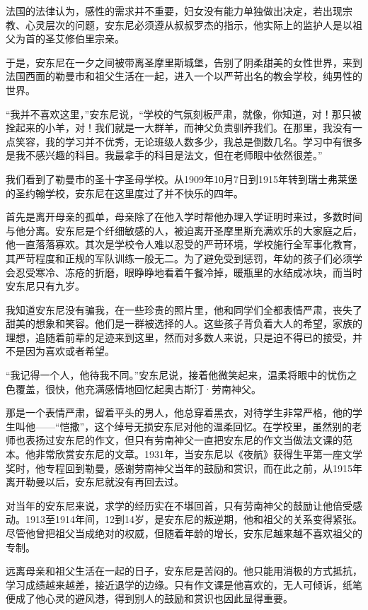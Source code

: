 法国的法律认为，感性的需求并不重要，妇女没有能力单独做出决定，若出现宗教、心灵层次的问题，安东尼必须遵从叔叔罗杰的指示，他实际上的监护人是以祖父为首的圣艾修伯里宗亲。

于是，安东尼在一夕之间被带离圣摩里斯城堡，告别了阴柔甜美的女性世界，来到法国西面的勒曼市和祖父生活在一起，进入一个以严苛出名的教会学校，纯男性的世界。

“我并不喜欢这里，”安东尼说，“学校的气氛刻板严肃，就像，你知道，对！那只被拴起来的小羊，对！我们就是一大群羊，而神父负责驯养我们。在那里，我没有一点笑容，我的学习并不优秀，无论班级人数多少，我总是倒数几名。学习中有很多是我不感兴趣的科目。我最拿手的科目是法文，但在老师眼中依然很差。”

我们看到了勒曼市的圣十字圣母学校。从1909年10月7日到1915年转到瑞士弗莱堡的圣约翰学校，安东尼在这里度过了并不快乐的四年。

首先是离开母亲的孤单，母亲除了在他入学时帮他办理入学证明时来过，多数时间与他分离。安东尼是个纤细敏感的人，被迫离开圣摩里斯充满欢乐的大家庭之后，他一直落落寡欢。其次是学校令人难以忍受的严苛环境，学校施行全军事化教育，其严苛程度和正规的军队训练一般无二。为了避免受到惩罚，年幼的孩子们必须学会忍受寒冷、冻疮的折磨，眼睁睁地看着午餐冷掉，暖瓶里的水结成冰块，而当时安东尼只有九岁。

我知道安东尼没有骗我，在一些珍贵的照片里，他和同学们全都表情严肃，丧失了甜美的想象和笑容。他们是一群被选择的人。这些孩子背负着大人的希望，家族的理想，追随着前辈的足迹来到这里，然而对多数人来说，只是迫不得已的接受，并不是因为喜欢或者希望。

“我记得一个人，他待我不同。”安东尼说，接着他微笑起来，温柔将眼中的忧伤之色覆盖，很快，他充满感情地回忆起奥古斯汀·劳南神父。

那是一个表情严肃，留着平头的男人，他总穿着黑衣，对待学生非常严格，他的学生叫他------“恺撒”，这个绰号无损安东尼对他的温柔回忆。在学校里，虽然别的老师也表扬过安东尼的作文，但只有劳南神父一直把安东尼的作文当做法文课的范本。他非常欣赏安东尼的文章。1931年，当安东尼以《夜航》获得生平第一座文学奖时，他专程回到勒曼，感谢劳南神父当年的鼓励和赏识，而在此之前，从1915年离开勒曼以后，安东尼就没有再回去过。

对当年的安东尼来说，求学的经历实在不堪回首，只有劳南神父的鼓励让他倍受感动。1913至1914年间，12到14岁，是安东尼的叛逆期，他和祖父的关系变得紧张。尽管他曾把祖父当成绝对的权威，但随着年龄的增长，安东尼越来越不喜欢祖父的专制。

远离母亲和祖父生活在一起的日子，安东尼是苦闷的。他只能用消极的方式抵抗，学习成绩越来越差，接近退学的边缘。只有作文课是他喜欢的，无人可倾诉，纸笔便成了他心灵的避风港，得到别人的鼓励和赏识也因此显得重要。

